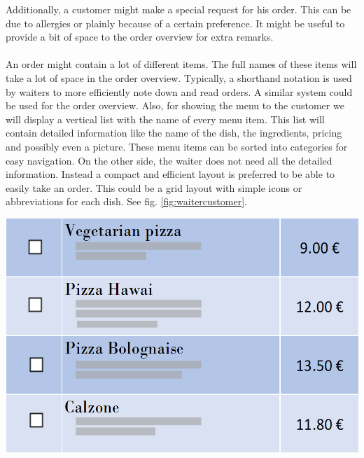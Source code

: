 \documentclass[12pt]{article}
\newenvironment{Figure}
	{\par\medskip\noindent\minipage{\linewidth}}
	{\endminipage\par\medskip}
\begin{document}
\begin{multicols}{2}
Additionally, a customer might make a special request for his order. This can be due to allergies or plainly because of a certain preference. It might be useful to provide a bit of space to the order overview for extra remarks.
\\\\
An order might contain a lot of different items. The full names of these items will take a lot of space in the order overview. Typically, a shorthand notation is used by waiters to more efficiently note down and read orders. A similar system could be used for the order overview.
Also, for showing the menu to the customer we will display a vertical list with the name of every menu item. This list will contain detailed information like the name of the dish, the ingredients, pricing and possibly even a picture. These menu items can be sorted into categories for easy navigation. On the other side, the waiter does not need all the detailed information. Instead a compact and efficient layout is preferred to be able to easily take an order. This could be a grid layout with simple icons or abbreviations for each dish. See fig. \ref{fig:waitercustomer}.
\begin{Figure}
		\includegraphics[width=\linewidth]{illustrations/customermenu.PNG}
		\label{fig:menucustomer}
\end{Figure}
\begin{Figure}

\end{Figure}
\end{multicols}
\end{document}
